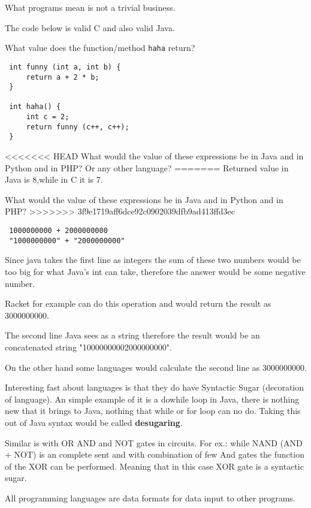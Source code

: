 \documentclass{article}
\begin{document}
\begin{flushleft}
What programs mean is not a trivial business.

The code below is valid C and also valid Java.

What value does the function/method \verb|haha| return?

\begin{verbatim}
 int funny (int a, int b) {
     return a + 2 * b;
 }
 
 int haha() {
     int c = 2;
     return funny (c++, c++);
 }
\end{verbatim}

<<<<<<< HEAD
What would the value of these expressions be in Java and in Python and in PHP? Or any other language?
=======
Returned value in Java is 8,while in C it is 7.

What would the value of these expressions be in Java and in Python and in PHP?
>>>>>>> 3f9e1719aff6dce92c0902039dfb9ad413ffd3ec
\begin{verbatim}
 1000000000 + 2000000000
 "1000000000" + "2000000000"
\end{verbatim}

Since java takes the first line as integers the sum of these two numbers would be too big for what Java's int can take, therefore the answer would be some negative number.

Racket for example can do this operation and would return the result as 3000000000.


The second line Java sees as a string therefore the result would be an concatenated string "10000000002000000000".

On the other hand some languages would calculate the second line as 3000000000.
\setlength{\parindent}{10ex}

\par Interesting fast about languages is that they do have Syntactic Sugar (decoration of language). An simple example of it is a dowhile loop in Java, there is nothing new that it brings to Java, nothing that while or for loop can no do. Taking this out of Java syntax would be called \textbf{desugaring}.

\noindent
Similar is with OR AND and NOT gates in circuits. For ex.: while NAND (AND + NOT) is an complete sent and with combination of few And gates the function of the XOR can be performed. Meaning that in this case XOR gate is a syntactic sugar.

All programming languages are data formats for data input to other programs.


\end{flushleft}
\end{document}

